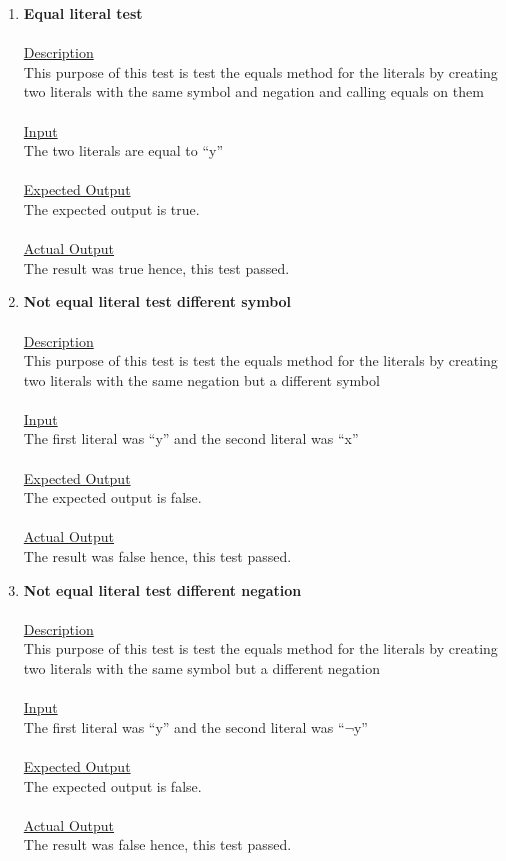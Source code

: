\documentclass{article}
\newcommand{\quotes}[1]{``#1''}
\begin{document}
\begin{enumerate}
		\item \textbf{Equal literal test}\\\\
		\underline{Description}\\
		\indent This purpose of this test is test the equals method for the literals by creating two literals with the same symbol and negation and calling equals on them\\\\
		\underline{Input}\\
		\indent The two literals are equal to \quotes{y}\\	\\
		\underline{Expected Output}\\
		\indent The expected output is true.\\\\
		\underline{Actual Output}\\
		\indent The result was true hence, this test passed.\\
		
				
		\item \textbf{Not equal literal test different symbol}\\\\
		\underline{Description}\\
		\indent This purpose of this test is test the equals method for the literals by creating two literals with the same negation but a different symbol\\\\
		\underline{Input}\\
		\indent The first literal was \quotes{y} and the second literal was \quotes{x}\\	\\
		\underline{Expected Output}\\
		\indent The expected output is false.\\\\
		\underline{Actual Output}\\
		\indent The result was false hence, this test passed.\\
		
				
		\item \textbf{Not equal literal test different negation}\\\\
		\underline{Description}\\
		\indent This purpose of this test is test the equals method for the literals by creating two literals with the same symbol but a different negation\\\\
		\underline{Input}\\
		\indent The first literal was \quotes{y} and the second literal was \quotes{$\neg$y}\\	\\
		\underline{Expected Output}\\
		\indent The expected output is false.\\\\
		\underline{Actual Output}\\
		\indent The result was false hence, this test passed.\\
		

\end{enumerate}
\end{document}
